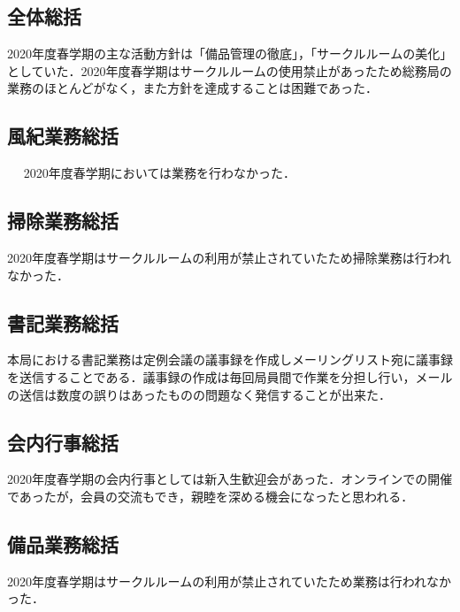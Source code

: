 \subsection*{全体総括}
2020年度春学期の主な活動方針は「備品管理の徹底」，「サークルルームの美化」としていた．2020年度春学期はサークルルームの使用禁止があったため総務局の業務のほとんどがなく，また方針を達成することは困難であった．

\subsection*{風紀業務総括}　
2020年度春学期においては業務を行わなかった．

\subsection*{掃除業務総括}
2020年度春学期はサークルルームの利用が禁止されていたため掃除業務は行われなかった．

\subsection*{書記業務総括}
本局における書記業務は定例会議の議事録を作成しメーリングリスト宛に議事録を送信することである．議事録の作成は毎回局員間で作業を分担し行い，メールの送信は数度の誤りはあったものの問題なく発信することが出来た．

\subsection*{会内行事総括}
2020年度春学期の会内行事としては新入生歓迎会があった．オンラインでの開催であったが，会員の交流もでき，親睦を深める機会になったと思われる．

\subsection*{備品業務総括}
2020年度春学期はサークルルームの利用が禁止されていたため業務は行われなかった．


